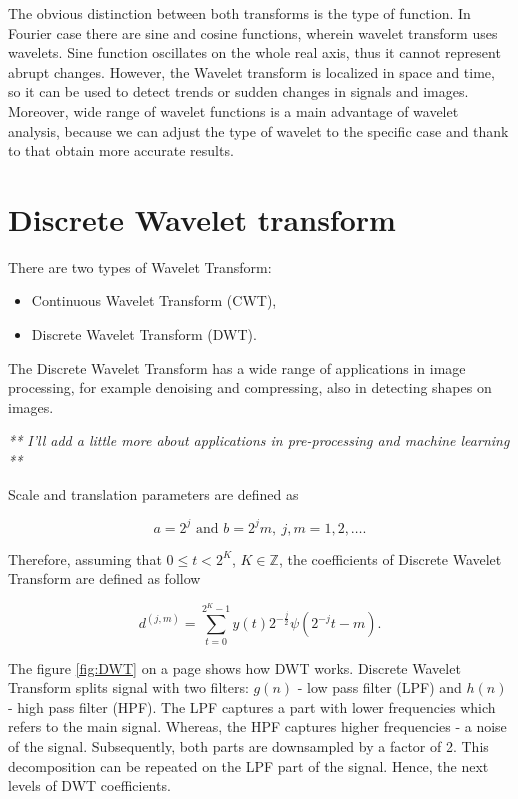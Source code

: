 The obvious distinction between both transforms is the type of function. In Fourier case there are sine and cosine functions, wherein wavelet transform uses wavelets. Sine function oscillates on the whole real axis, thus it cannot represent abrupt changes. However, the Wavelet transform is localized in space and time, so it can be used to detect trends or sudden changes in signals and images. Moreover, wide range of wavelet functions is a main advantage of wavelet analysis, because we can adjust the type of wavelet to the specific case and thank to that obtain more accurate results.

\section{Discrete Wavelet transform}

There are two types of Wavelet Transform:
\begin{itemize}
	\item Continuous Wavelet Transform (CWT),
	\item Discrete Wavelet Transform (DWT).
\end{itemize}

The Discrete Wavelet Transform has a wide range of applications in image processing, for example denoising and compressing, also in detecting shapes on images.

\textit{** I'll add a little more about applications in pre-processing and machine learning **}

Scale and translation parameters are defined as

\begin{equation}
a = 2^j \text{ and } b = 2^j m,\ j,m=1,2,\ldots.
\end{equation}

Therefore, assuming that $0 \leq t < 2^K$, $K \in \mathbb{Z}$, the coefficients of Discrete Wavelet Transform are defined as follow

\begin{equation}
d^{(j,m)}=\sum_{t=0}^{2^K -1} y(t) 2^{-\frac{j}{2}} \psi\left(2^{-j}t - m\right).
\end{equation}

The figure \ref{fig:DWT} on a page \pageref{fig:DWT} shows how DWT works. Discrete Wavelet Transform splits signal with two filters: $g(n)$ - low pass filter (LPF) and $h(n)$ - high pass filter (HPF). The LPF captures a part with lower frequencies which refers to the main signal. Whereas, the HPF captures higher frequencies - a noise of the signal. Subsequently, both parts are downsampled by a factor of 2. This decomposition can be repeated on the LPF part of the signal. Hence, the next levels of DWT coefficients.

